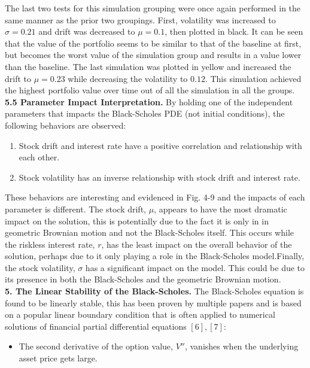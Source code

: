 \documentclass{report}
\begin{document}
	The last two tests for this simulation grouping were once again performed in the same manner as the prior two groupings. First, volatility was increased to $\sigma = 0.21$ and drift was decreased to $\mu=0.1$, then plotted in black. It can be seen that the value of the portfolio seems to be similar to that of the baseline at first, but becomes the worst value of the simulation group and results in a value lower than the baseline. The last simulation was plotted in yellow and increased the drift to $\mu = 0.23$ while decreasing the volatility to $0.12$. This simulation achieved the highest portfolio value over time out of all the simulation in all the groups.
	\\	
	
	\textbf{5.5 Parameter Impact Interpretation.} By holding one of the independent parameters that impacts the Black-Scholes PDE (not initial conditions), the following behaviors are observed:
	\begin{enumerate}
		\item Stock drift and interest rate have a positive correlation and relationship with each other.
		\item Stock volatility has an inverse relationship with stock drift and interest rate.
	\end{enumerate}
	
	These behaviors are interesting and evidenced in Fig. 4-9 and the impacts of each parameter is different. The stock drift, $\mu$, appears to have the most dramatic impact on the solution, this is potentially due to the fact it is only in in geometric Brownian motion and not the Black-Scholes itself. This occurs while the riskless interest rate, $r$, has the least impact on the overall behavior of the solution, perhaps due to it only playing a role in the Black-Scholes model.Finally, the stock volatility, $\sigma$ has a significant impact on the model. This could be due to its presence in both the Black-Scholes and the geometric Brownian motion.\\
	
	\textbf{5. The Linear Stability of the Black-Scholes.} The Black-Scholes equation is found to be linearly stable, this has been proven by multiple papers and is based on a popular linear boundary condition that is often applied to numerical solutions of financial partial differential equations $[6],[7]$:
	\begin{itemize}
		\item[] The second derivative of the option value, $V''$, vanishes when the underlying asset price gets large.	
	\end{itemize}
	
\end{document}
